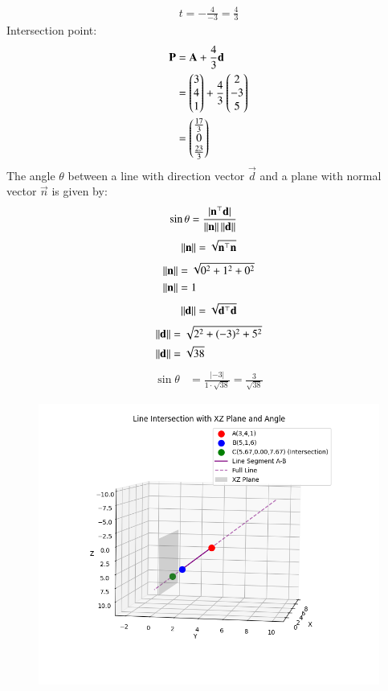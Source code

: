 \documentclass[journal]{IEEEtran}
\begin{document}
\begin{align}
    t = -\frac{4}{-3} = \frac{4}{3}
\end{align}
Intersection point:
\begin{align}
\mathbf{P} &= \mathbf{A} + \frac{4}{3}\mathbf{d}\\
&=\begin{pmatrix}3 \\ 4 \\ 1\end{pmatrix} + \frac{4}{3}\begin{pmatrix}2 \\ -3 \\ 5\end{pmatrix}\\
&=\begin{pmatrix}\frac{17}{3} \\ 0 \\ \frac{23}{3}\end{pmatrix}
\end{align}
The angle $\theta$ between a line with direction vector $\vec{d}$ and a plane with normal vector $\vec{n}$ is given by:
\begin{align}
\sin\theta &= \frac{|\mathbf{n}^\top \mathbf{d}|}{\left\lVert\mathbf{n}\right\rVert\left\lVert\mathbf{d}\right\rVert}
\end{align}
\begin{align}
\left\lVert\mathbf{n}\right\rVert=\sqrt{\mathbf{n}^\top\mathbf{n}}
\end{align}
\begin{align}
\left\lVert\mathbf{n}\right\rVert&=\sqrt{0^2 + 1^2 + 0^2}\\
\left\lVert\mathbf{n}\right\rVert&= 1
\end{align}
\begin{align}
\left\lVert\mathbf{d}\right\rVert=\sqrt{\mathbf{d}^\top\mathbf{d}}
\end{align}
\begin{align}
\left\lVert\mathbf{d}\right\rVert&= \sqrt{2^2 + (-3)^2 + 5^2}\\
\left\lVert\mathbf{d}\right\rVert&=\sqrt{38}
\end{align}
\begin{align}
    \sin\theta &= \frac{|-3|}{1 \cdot \sqrt{38}} = \frac{3}{\sqrt{38}}
\end{align}


\begin{figure}[H]
\centering
\includegraphics[width=0.8\columnwidth]{figs/fig1.png}
\caption{}
\label{fig:1}
\end{figure}
\end{document}
